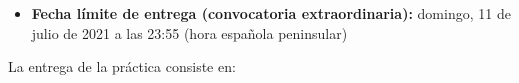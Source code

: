 \begin{itemize}
\item \textbf{Fecha límite de entrega (convocatoria extraordinaria):} domingo, 11 de julio de 2021 a las 23:55 (hora española peninsular)

    

\end{itemize}

La entrega de la práctica consiste en:

